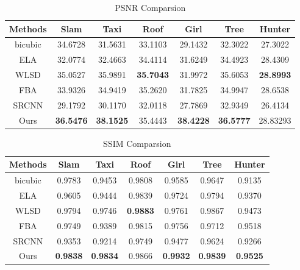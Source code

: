 \begin{table*}
\center
\begin{tabular}{|c|c|c|c|c|c|c|}
  \hline
  Methods & Slam         & Taxi & Roof & Girl      & Tree  & Hunter   \\\hline
  bicubic & 34.6728          & 31.5631             &33.1103             &29.1432    		 & 32.3022              & 27.3022  \\  \hline
  ELA     & 32.0774          & 32.4663             &34.4114             &31.6249             & 34.4923               & 28.4309  \\ \hline
  WLSD    & 35.0527          & 35.9891             &\textbf{35.7043}    &31.9972             & 35.6053               & \textbf{28.8993} \\ \hline
  FBA     & 33.9326          & 34.9419             &35.2620             &31.7825             & 34.9947               & 28.6538  \\ \hline
  SRCNN   & 29.1792          & 30.1170             &32.0118             &27.7869             & 32.9349               & 26.4134  \\ \hline
  Ours    & \textbf{36.5476} & \textbf{38.1525}    &35.4443             &\textbf{38.4228}    &\textbf{36.5777}       & 28.83293 \\ \hline
\end{tabular}
\caption{PSNR Comparsion}
\label{tab:psnr_comparsion}
\end{table*}
\begin{table*}
	\center
	\begin{tabular}{|c|c|c|c|c|c|c|}
		\hline
		Methods & Slam        & Taxi       & Roof       			& Girl             & Tree             & Hunter  \\\hline
		bicubic & 0.9783          & 0.9453           & 0.9808     			&0.9585            &0.9647            & 0.9135   \\  \hline
		ELA     & 0.9605          & 0.9444           & 0.9839     			&0.9724            &0.9794            & 0.9370   \\ \hline
		WLSD    & 0.9794          & 0.9746           & \textbf{0.9883}      &0.9761            &0.9867            & 0.9473  \\ \hline
		FBA     & 0.9749          & 0.9389           & 0.9815     			&0.9756        	   &0.9712            & 0.9518   \\ \hline
		SRCNN   & 0.9353          & 0.9214           & 0.9749     			&0.9477            &0.9624            & 0.9266 \\ \hline
		Ours    & \textbf{0.9838} & \textbf{0.9834}  & 0.9866     			& \textbf{0.9932}  &\textbf{0.9839 } & \textbf{0.9525 } \\ \hline
	\end{tabular}
	\caption{SSIM Comparsion}
	\label{tab:ssim_comparsion}
\end{table*}
